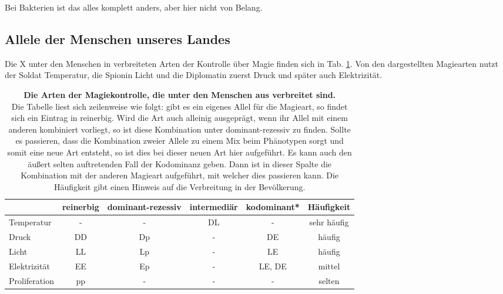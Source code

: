 Bei Bakterien ist das alles komplett anders, aber hier nicht von Belang.


\subsection{Allele der Menschen unseres Landes} %
Die X %
unter den Menschen in  verbreiteten Arten der Kontrolle über Magie finden sich in Tab. \ref{tab:landmagie}.
Von den dargestellten Magiearten nutzt der Soldat Temperatur, %
die Spionin Licht %
und die Diplomatin zuerst Druck und später auch Elektrizität. %

\begin{table}[hbtp]
	\centering
	\caption[Verbreitete Magiearten in ]%
	{\textbf{Die Arten der Magiekontrolle, die unter den Menschen aus  verbreitet sind. } \\
		Die Tabelle liest sich zeilenweise wie folgt: gibt es ein eigenes Allel für die Magieart, so findet sich ein Eintrag in reinerbig.
		Wird die Art auch alleinig ausgeprägt, wenn ihr Allel mit einem anderen kombiniert vorliegt, so ist diese Kombination unter dominant-rezessiv zu finden.
		Sollte es passieren, dass die Kombination zweier Allele zu einem Mix beim Phänotypen sorgt und somit eine neue Art entsteht, so ist dies bei dieser neuen Art hier aufgeführt.
		Es kann auch den äußert selten auftretenden Fall der Kodominanz geben.
		Dann ist in dieser Spalte die Kombination mit der anderen Magieart aufgeführt, mit welcher dies passieren kann.
		Die Häufigkeit gibt einen Hinweis auf die Verbreitung in der Bevölkerung.
		} 
	\label{tab:landmagie}
	\begin{threeparttable}
		\begin{tabularx}{\textwidth}{l|cccc|c}
			\toprule
			              & reinerbig & dominant-rezessiv & intermediär & kodominant* & Häufigkeit  \\ \midrule
			 Temperatur   &     -      &         -         &     DL      &      -      & sehr häufig \\
			    Druck     & DD        &        Dp         &      -      &     DE      &   häufig    \\
			    Licht     & LL        &        Lp         &      -      &     LE      &   häufig    \\
			Elektrizität  & EE        &        Ep         &      -      &   LE, DE    & mittel \\
			Proliferation & pp        &         -          &      -      &      -      &   selten    \\ \bottomrule
		\end{tabularx}
	\end{threeparttable} 
\end{table}



